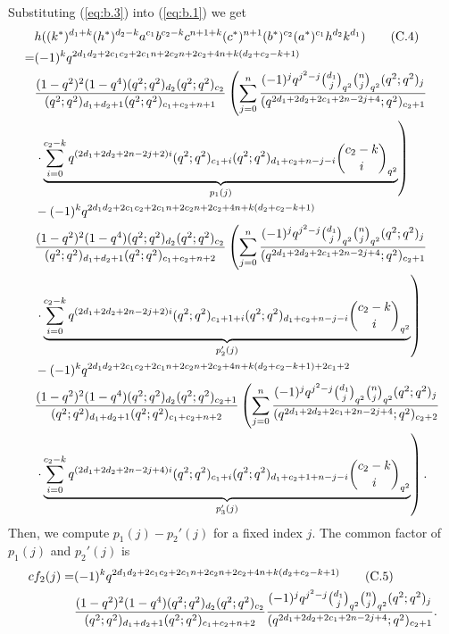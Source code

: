 \documentclass[table,a4paper,reqno]{amsart}
\numberwithin{equation}{section}
\theoremstyle{definition}
\begin{document}
Substituting (\ref{eq:b.3}) into (\ref{eq:b.1}) we get
\begin{align}\label{eq:b.4}\stepcounter{equation}
        &h((k^*)^{d_1+k}(h^*)^{d_2-k}a^{c_1}b^{c_2-k}c^{n+1+k}(c^*)^{n+1}(b^*)^{c_2}(a^*)^{c_1}h^{d_2}k^{d_1})\tag{C.4}\\
        =&(-1)^kq^{2d_1d_2+2c_1c_2+2c_1n+2c_2n+2c_2+4n+k(d_2+c_2-k+1)}\notag\\
        &\frac{(1-q^2)^2(1-q^4)(q^2;q^2)_{d_2}(q^2;q^2)_{c_2}}{(q^2;q^2)_{d_1+d_2+1}(q^2;q^2)_{c_1+c_2+n+1}}\left(\sum_{j=0}^{n}\frac{(-1)^{j}q^{j^2-j}{d_1\choose j}_{q^{2}}{n\choose j}_{q^2}(q^2;q^2)_{j}}{(q^{2d_1+2d_2+2c_1+2n-2j+4};q^2)_{c_2+1}}\right.\notag\\
        &\left.\cdot\underbrace{\sum_{i=0}^{c_2-k}q^{(2d_1+2d_2+2n-2j+2)i}(q^2;q^2)_{c_1+i}(q^2;q^2)_{d_1+c_2+n-j-i}{c_2-k\choose i}_{q^2}}_{p_1(j)}\right)\notag\\
        &-(-1)^kq^{2d_1d_2+2c_1c_2+2c_1n+2c_2n+2c_2+4n+k(d_2+c_2-k+1)}\notag\\
        &\frac{(1-q^2)^2(1-q^4)(q^2;q^2)_{d_2}(q^2;q^2)_{c_2}}{(q^2;q^2)_{d_1+d_2+1}(q^2;q^2)_{c_1+c_2+n+2}}\left(\sum_{j=0}^{n}\frac{(-1)^{j}q^{j^2-j}{d_1\choose j}_{q^{2}}{n\choose j}_{q^2}(q^2;q^2)_{j}}{(q^{2d_1+2d_2+2c_1+2n-2j+4};q^2)_{c_2+1}}\right.\notag\\
        &\left.\cdot\underbrace{\sum_{i=0}^{c_2-k}q^{(2d_1+2d_2+2n-2j+2)i}(q^2;q^2)_{c_1+1+i}(q^2;q^2)_{d_1+c_2+n-j-i}{c_2-k\choose i}_{q^2}}_{p_2'(j)}\right)\notag\\
        &-(-1)^kq^{2d_1d_2+2c_1c_2+2c_1n+2c_2n+2c_2+4n+k(d_2+c_2-k+1)+2c_1+2}\notag\\
        &\frac{(1-q^2)^2(1-q^4)(q^2;q^2)_{d_2}(q^2;q^2)_{c_2+1}}{(q^2;q^2)_{d_1+d_2+1}(q^2;q^2)_{c_1+c_2+n+2}}\left(\sum_{j=0}^{n}\frac{(-1)^{j}q^{j^2-j}{d_1\choose j}_{q^{2}}{n\choose j}_{q^2}(q^2;q^2)_{j}}{(q^{2d_1+2d_2+2c_1+2n-2j+4};q^2)_{c_2+2}}\right.\notag\\
        &\left.\cdot\underbrace{\sum_{i=0}^{c_2-k}q^{(2d_1+2d_2+2n-2j+4)i}(q^2;q^2)_{c_1+i}(q^2;q^2)_{d_1+c_2+1+n-j-i}{c_2-k\choose i}_{q^2}}_{p_3'(j)}\right).\notag
\end{align}
Then, we compute $p_1(j)-p_2'(j)$ for a fixed index $j$. The common factor of $p_1(j)$ and $p_2'(j)$ is 
\begin{align}\stepcounter{equation}
        cf_2(j)=&(-1)^kq^{2d_1d_2+2c_1c_2+2c_1n+2c_2n+2c_2+4n+k(d_2+c_2-k+1)}\tag{C.5}\\
        &\frac{(1-q^2)^2(1-q^4)(q^2;q^2)_{d_2}(q^2;q^2)_{c_2}}{(q^2;q^2)_{d_1+d_2+1}(q^2;q^2)_{c_1+c_2+n+2}}\frac{(-1)^{j}q^{j^2-j}{d_1\choose j}_{q^{2}}{n\choose j}_{q^2}(q^2;q^2)_{j}}{(q^{2d_1+2d_2+2c_1+2n-2j+4};q^2)_{c_2+1}}.\notag
\end{align}
\end{document}
